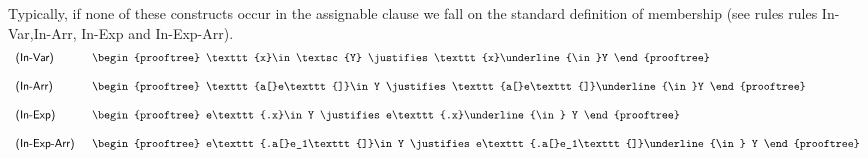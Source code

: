 \documentclass[a4paper]{llncs}
\begin{document}
Typically, if none of these constructs occur in the assignable clause
we fall on the standard definition of membership (see rules rules
\textsf{In-Var},\textsf{In-Arr}, \textsf{In-Exp} and
\textsf{In-Exp-Arr}).
\[
\begin{tabular}{ll}
\textsf{(In-Var)} &
\begin{prooftree}
\texttt{x}\in \textsc{Y}
\justifies
\texttt{x}\underline{\in}Y
\end{prooftree}
\\[3.0ex]
\textsf{(In-Arr)} &
\begin{prooftree}
\texttt{a[}e\texttt{]}\in Y
\justifies
\texttt{a[}e\texttt{]}\underline{\in}Y
\end{prooftree}
\\[3.0ex]
\textsf{(In-Exp)} &
\begin{prooftree}
e\texttt{.x}\in Y
\justifies
e\texttt{.x}\underline{\in} Y
\end{prooftree}
\\[3.0ex]
\textsf{(In-Exp-Arr)}\,\, &
\begin{prooftree}
e\texttt{.a[}e_1\texttt{]}\in Y
\justifies
e\texttt{.a[}e_1\texttt{]}\underline{\in} Y
\end{prooftree}
\end{tabular}
\]
\end{document}
